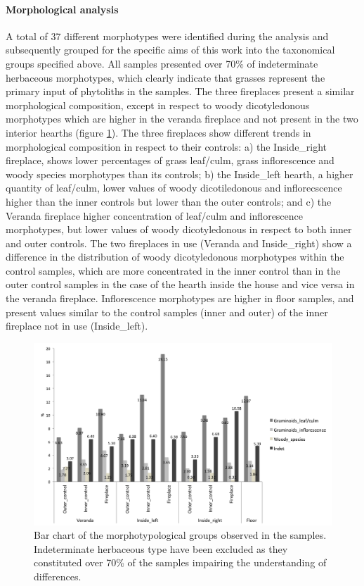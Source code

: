 \documentclass[authoryear,preprint,review,12pt]{elsarticle}
\begin{document}
\paragraph{Morphological analysis}
A total of 37 different morphotypes were identified during the analysis and subsequently grouped for the specific aims of this work into the taxonomical groups specified above. All samples presented over 70\% of indeterminate herbaceous morphotypes, which clearly indicate that grasses represent the primary input of phytoliths in the samples. The three fireplaces present a similar morphological composition, except in respect to woody dicotyledonous morphotypes which are higher in the veranda fireplace and not present in the two interior hearths (figure \ref{fig:morpho}). The three fireplaces show different trends in morphological composition in respect to their controls: a) the Inside\_right fireplace, shows lower percentages of grass leaf/culm, grass inflorescence and woody species morphotypes than its controls; b) the Inside\_left hearth, a higher quantity of leaf/culm, lower values of woody dicotiledonous and inflorecscence higher than the inner controls but lower than the outer controls; and c) the Veranda fireplace higher concentration of leaf/culm and inflorescence morphotypes, but lower values of woody dicotyledonous in respect to both inner and outer controls. The two fireplaces in use (Veranda and Inside\_right) show a difference in the distribution of woody dicotyledonous morphotypes within the control samples, which are more concentrated in the inner control than in the outer control samples in the case of the hearth inside the house and vice versa in the veranda fireplace. Inflorescence morphotypes are higher in floor samples, and present values similar to the control samples (inner and outer) of the inner fireplace not in use (Inside\_left).

\begin{figure}[ht!]
  \begin{center}
    \includegraphics[width=15cm]{figures/fp_bar}
    \caption{Bar chart of the morphotypological groups observed in the samples. Indeterminate herbaceous type have been excluded as they constituted over 70\% of the samples impairing the understanding of differences.}
    \label{fig:morpho}
  \end{center}
\end{figure}
\end{document}
